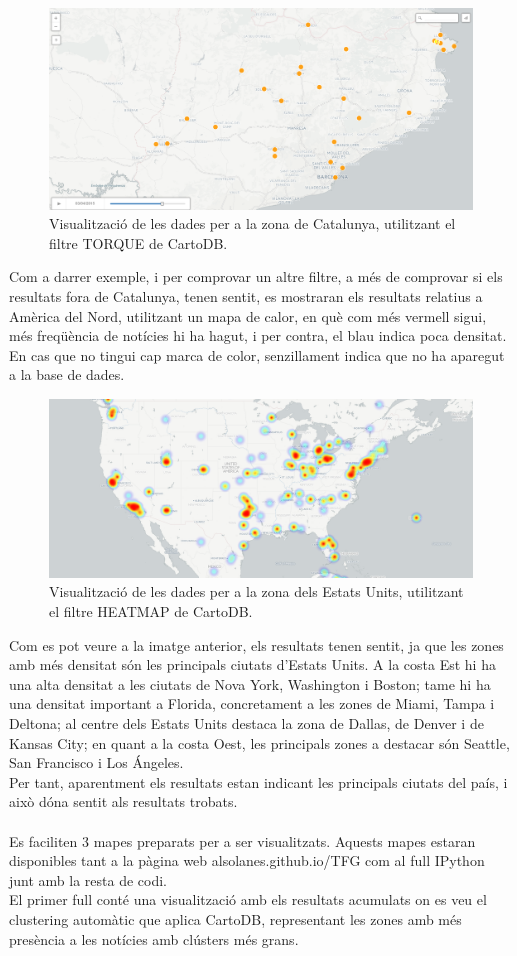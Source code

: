 \documentclass[12pt,a4paper,openright,oneside]{article}
\numberwithin{equation}{section}
\theoremstyle{definition}
\begin{document}
\begin{figure}[!htbp]
\centering
\includegraphics[width=12cm]{cartodb-2.png}
\caption{Visualització de les dades per a la zona de Catalunya, utilitzant el filtre TORQUE de CartoDB.}
\end{figure}
\newpage
Com a darrer exemple, i per comprovar un altre filtre, a més de comprovar si els resultats fora de Catalunya, tenen sentit, es mostraran els resultats relatius a Amèrica del Nord, utilitzant un mapa de calor, en què com més vermell sigui, més freqüència de notícies hi ha hagut, i per contra, el blau indica poca densitat. En cas que no tingui cap marca de color, senzillament indica que no ha aparegut a la base de dades.

\begin{figure}[!htbp]
\centering
\includegraphics[width=12cm]{cartodb-3.png}
\caption{Visualització de les dades per a la zona dels Estats Units, utilitzant el filtre HEATMAP de CartoDB.}
\end{figure}

Com es pot veure a la imatge anterior, els resultats tenen sentit, ja que les zones amb més densitat són les principals ciutats d'Estats Units. A la costa Est hi ha una alta densitat a les ciutats de Nova York, Washington i Boston; tame hi ha una densitat important a Florida, concretament a les zones de Miami, Tampa i Deltona; al centre dels Estats Units destaca la zona de Dallas, de Denver i de Kansas City; en quant a la costa Oest, les principals zones a destacar són Seattle, San Francisco i Los Ángeles.\\
Per tant, aparentment els resultats estan indicant les principals ciutats del país, i això dóna sentit als resultats trobats.\\\\
Es faciliten 3 mapes preparats per a ser visualitzats. Aquests mapes estaran disponibles tant a la pàgina web alsolanes.github.io/TFG com al full IPython junt amb la resta de codi.\\
El primer full conté una visualització amb els resultats acumulats on es veu el clustering automàtic que aplica CartoDB, representant les zones amb més presència a les notícies amb clústers més grans.
\end{document}
